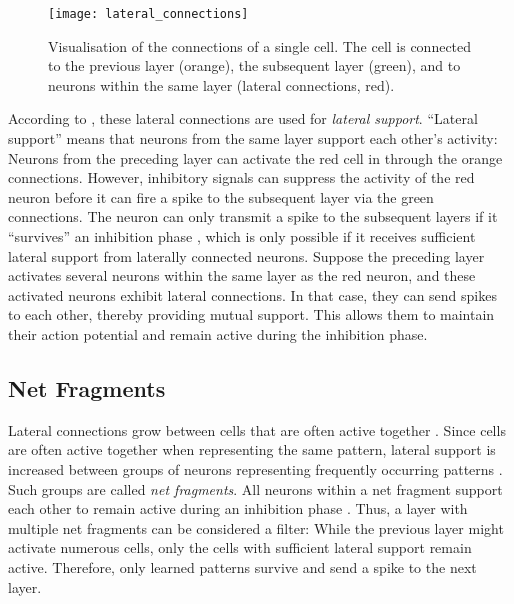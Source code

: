 \begin{figure}[h]
    \centering
    \texttt{[image: lateral\_connections]}
    \caption[Lateral connections of a cell]{Visualisation of the connections of a single cell. The cell is connected to the previous layer (orange), the subsequent layer (green), and to neurons within the same layer (lateral connections, red).}
\end{figure}

According to , these lateral connections are used for \emph{lateral support}. ``Lateral support'' means that neurons from the same layer support each other's activity:
Neurons from the preceding layer can activate the red cell in  through the orange connections.
However, inhibitory signals can suppress the activity  of the red neuron before it can fire a spike to the subsequent layer via the green connections. The neuron can only transmit a spike to the subsequent layers if it ``survives'' an inhibition phase , which is only possible if it receives sufficient lateral support from laterally connected neurons.
Suppose the preceding layer activates several neurons within the same layer as the red neuron, and these activated neurons exhibit lateral connections. In that case, they can send spikes to each other, thereby providing mutual support. This allows them to maintain their action potential and remain active during the inhibition phase.

\subsection{Net Fragments}
Lateral connections grow between cells that are often active together .
Since cells are often active together when representing the same pattern, lateral support is increased between groups of neurons representing frequently occurring patterns . Such groups are called \emph{net fragments}.
All neurons within a net fragment support each other to remain active during an inhibition phase \cite{vogels_inhibitory_2011}. 
Thus, a layer with multiple net fragments can be considered a filter: While the previous layer might activate numerous cells, only the cells with sufficient lateral support remain active. Therefore, only learned patterns survive and send a spike to the next layer.


